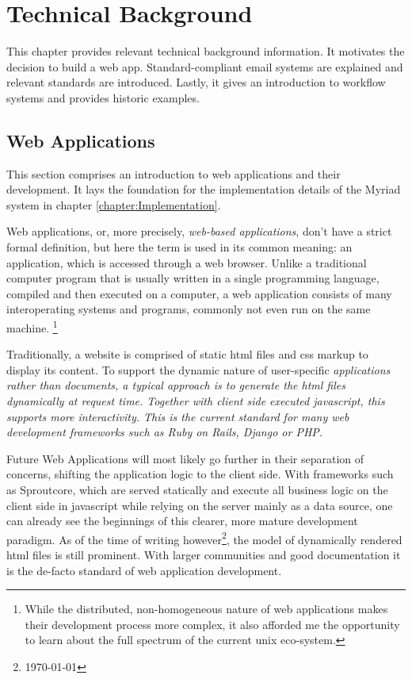\chapter{Technical Background}
\label{chapter:Technical}

This chapter provides relevant technical background information. It motivates the decision to build a web app. Standard-compliant email systems are explained and relevant standards are introduced. Lastly, it gives an introduction to workflow systems and provides historic examples.

\section{Web Applications}

This section comprises an introduction to web applications and their development. It lays the foundation for the implementation details of the Myriad system in chapter \autoref{chapter:Implementation}.

Web applications, or, more precisely, \emph{web-based applications}, don't have a strict formal definition, but here the term is used in its common meaning\cite{webapptrends}: an application, which is accessed through a web browser. Unlike a traditional computer program that is usually written in a single programming language, compiled and then executed on a computer, a web application consists of many interoperating systems and programs, commonly not even run on the same machine. \footnote{While the distributed, non-homogeneous nature of web applications makes their development process more complex, it also afforded me the opportunity to learn about the full spectrum of the current unix eco-system.}

Traditionally, a website is comprised of static \gls{html} files and \gls{css} markup to display its content. To support the dynamic nature of user-specific \em{applications} rather than \em{documents}, a typical approach is to generate the \gls{html} files dynamically at request time. Together with client side executed javascript, this supports more interactivity. This is the current standard for many web development frameworks such as Ruby on Rails, Django or PHP.

Future Web Applications will most likely go further in their separation of concerns, shifting the application logic to the client side. With frameworks such as Sproutcore, which are served statically and execute all business logic on the client side in javascript while relying on the server mainly as a data source, one can already see the beginnings of this clearer, more mature development paradigm. As of the time of writing however\footnote{ \today }, the model of dynamically rendered \gls{html} files is still prominent. With larger communities and good documentation it is the de-facto standard of web application development.

